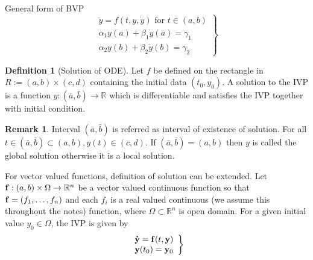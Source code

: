 \documentclass[12pt,reqno]{amsart}
\theoremstyle{plain}
\theoremstyle{definition}
\newtheorem{defn}{Definition}
\newtheorem{rem}{Remark}
\newcommand{\R}{\mathbb{R}}
\begin{document}
General form of BVP
$$ 
\left.
\begin{array}{l}
    \ddot{y} = f(t, y, \dot{y}) \text{ for } t \in (a,b) \\
    \alpha_1y(a) + \beta_1 \dot{y}(a) = \gamma_1 \\
    \alpha_2 y(b) + \beta_2 \dot{y}(b) = \gamma_2     
\end{array}
\right\}
$$
\begin{defn}[Solution of ODE]
    Let $f$ be defined on the rectangle in $ R:= (a,b) \times (c,d)$ containing the initial data $(t_0, y_0)$. A solution to the IVP is a function $ y : (\bar{a}, \bar{b}) \to \R$ which is differentiable and satisfies the IVP together with initial condition.
\end{defn}
\begin{rem}
    Interval $(\bar{a}, \bar{b})$ is referred as interval of existence of solution. For all $ t \in (\bar{a}, \bar{b}) \subset (a,b), y(t) \in (c,d)$. If $(\bar{a},\bar{b}) = (a,b)$ then $y$ is called the global solution otherwise it is a local solution. 
\end{rem}
For vector valued functions, definition of solution can be extended.
Let ${\bf f}:(a,b) \times \Omega \to \R^n$ be a vector valued continuous function so that ${\bf f} = (f_1, \dots, f_n)$ and each $f_i$ is a real valued continuous (we assume this throughout the notes) function, where $\Omega \subset \R^n$ is open domain. For a given initial value $y_0 \in \Omega$, the IVP is given by 
$$
\left.
\begin{array}{l}
    {\bf \dot{y} = f}(t, {\bf y}) \\
    {\bf y}(t_0) = {\bf y}_0    
\end{array}
\right\}
$$
\end{document}
